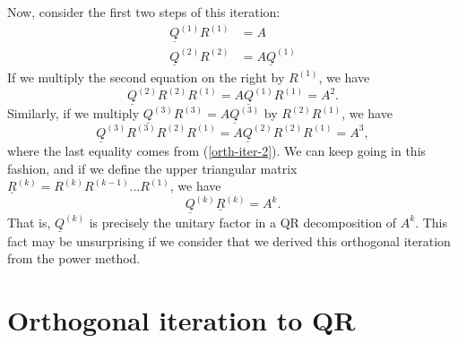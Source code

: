 \documentclass[12pt, leqno]{article} %
\newcommand{\uQ}{\underline{Q}}
\newcommand{\uR}{\underline{R}}
\begin{document}
Now, consider the first two steps of this iteration:
\begin{align*}
  \uQ^{(1)} R^{(1)} &= A \\
  \uQ^{(2)} R^{(2)} &= A \uQ^{(1)}
\end{align*}
If we multiply the second equation on the right by $R^{(1)}$,
we have
\begin{equation} \label{orth-iter-2}
  \uQ^{(2)} R^{(2)} R^{(1)} = A \uQ^{(1)} R^{(1)} = A^2.
\end{equation}
Similarly, if we multiply $\uQ^{(3)} R^{(3)} = A \uQ^{(3)}$ by $R^{(2)} R^{(1)}$,
we have
\[
  \uQ^{(3)} R^{(3)} R^{(2)} R^{(1)} = A \uQ^{(2)} R^{(2)} R^{(1)} = A^3,
\]
where the last equality comes from (\ref{orth-iter-2}).
We can keep going in this fashion, and if we define the
upper triangular matrix
$\uR^{(k)} = R^{(k)} R^{(k-1)} \ldots R^{(1)}$, we have
\[
  \uQ^{(k)} \uR^{(k)} = A^k.
\]
That is, $\uQ^{(k)}$ is precisely the unitary factor in a QR
decomposition of $A^k$.  This fact may be unsurprising if
we consider that we derived this orthogonal iteration from
the power method.

\section{Orthogonal iteration to QR}
\end{document}
